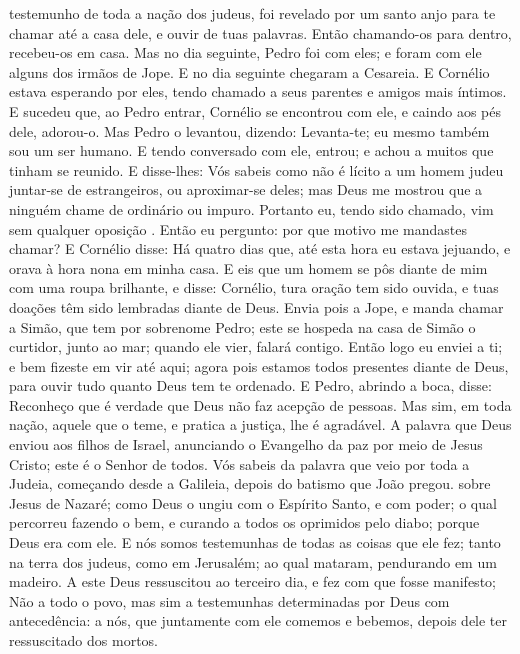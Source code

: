 {{} testemunho de toda a nação dos judeus, foi revelado por um santo anjo para te chamar até a casa dele, e ouvir de tuas palavras.
Então chamando-os para dentro, recebeu-os em casa. Mas no dia seguinte, Pedro foi com eles; e foram com ele alguns dos irmãos de Jope.
E no dia seguinte chegaram a Cesareia. E Cornélio estava esperando por eles, tendo chamado a seus parentes e amigos mais íntimos.
E sucedeu que, ao Pedro entrar, Cornélio se encontrou com ele, e caindo aos pés dele, adorou-o.
Mas Pedro o levantou, dizendo: Levanta-te; eu mesmo também sou um ser humano.
E tendo conversado com ele, entrou; e achou a muitos que
{} tinham se reunido.
E disse-lhes: Vós sabeis como não é lícito a um homem judeu juntar-se de estrangeiros, ou aproximar-se deles; mas Deus me mostrou que a ninguém chame de ordinário ou impuro.
Portanto eu, tendo sido chamado, vim sem qualquer oposição
{} . Então eu pergunto: por que motivo me mandastes chamar?
E Cornélio disse: Há quatro dias que, até esta hora eu estava jejuando, e orava à hora nona em minha casa.
E eis que um homem se pôs diante de mim com uma roupa brilhante, e disse: Cornélio, tura oração tem sido ouvida, e tuas doações têm sido lembradas diante de Deus.
Envia pois a Jope, e manda chamar a Simão, que tem por sobrenome Pedro; este se hospeda na casa de Simão o curtidor, junto ao mar; quando ele vier, falará contigo.
Então logo eu enviei a ti; e bem fizeste em vir até aqui; agora pois estamos todos
{} presentes diante de Deus, para ouvir tudo quanto Deus tem te ordenado.
E Pedro, abrindo a boca, disse: Reconheço que é verdade que Deus não faz acepção de pessoas.
Mas sim, em toda nação, aquele que o teme, e pratica a justiça,
{} lhe é agradável.
A palavra que Deus enviou aos filhos de Israel, anunciando o Evangelho da paz por meio de Jesus Cristo; este é o Senhor de todos.
Vós sabeis da palavra que veio por toda a Judeia, começando desde a Galileia, depois do batismo que João pregou.
 sobre Jesus de Nazaré; como Deus o ungiu com o Espírito Santo, e com poder; o qual percorreu
{} fazendo o bem, e curando a todos os oprimidos pelo diabo; porque Deus era com ele.
E nós somos testemunhas de todas as coisas que ele fez; tanto na terra dos judeus, como em Jerusalém; ao qual mataram, pendurando
{} em um madeiro.
A este Deus ressuscitou ao terceiro dia, e fez com que fosse manifesto;
Não a todo o povo, mas sim a testemunhas determinadas por Deus com antecedência: a nós, que juntamente com ele comemos e bebemos, depois dele ter ressuscitado dos mortos.
}

